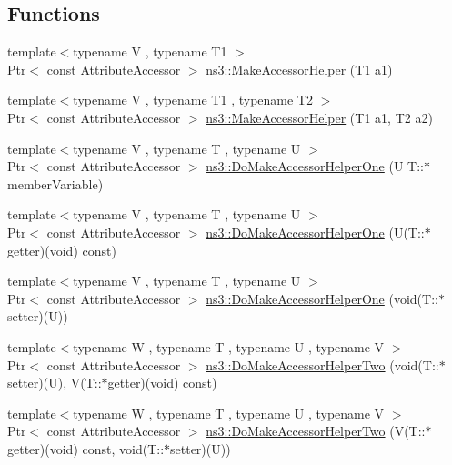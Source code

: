 \subsection*{Functions}
\begin{DoxyCompactItemize}
\item 
{\footnotesize template$<$typename V , typename T1 $>$ }\\Ptr$<$ const Attribute\+Accessor $>$ \hyperlink{group__attributeimpl_ga9fcb2910982e978ae6ee07b2909bfe2e}{ns3\+::\+Make\+Accessor\+Helper} (T1 a1)
\item 
{\footnotesize template$<$typename V , typename T1 , typename T2 $>$ }\\Ptr$<$ const Attribute\+Accessor $>$ \hyperlink{group__attributeimpl_ga17f73743ac49b64502707ca2b68dfa10}{ns3\+::\+Make\+Accessor\+Helper} (T1 a1, T2 a2)
\item 
{\footnotesize template$<$typename V , typename T , typename U $>$ }\\Ptr$<$ const Attribute\+Accessor $>$ \hyperlink{group__attributeimpl_gaee5b20c72f968868a1bef8f01db84263}{ns3\+::\+Do\+Make\+Accessor\+Helper\+One} (U T\+::$\ast$member\+Variable)
\item 
{\footnotesize template$<$typename V , typename T , typename U $>$ }\\Ptr$<$ const Attribute\+Accessor $>$ \hyperlink{group__attributeimpl_ga0e14362190176fd84511ad67a914108b}{ns3\+::\+Do\+Make\+Accessor\+Helper\+One} (U(T\+::$\ast$getter)(void) const)
\item 
{\footnotesize template$<$typename V , typename T , typename U $>$ }\\Ptr$<$ const Attribute\+Accessor $>$ \hyperlink{group__attributeimpl_gadc84053499d71ac5f8f243133a9b96b6}{ns3\+::\+Do\+Make\+Accessor\+Helper\+One} (void(T\+::$\ast$setter)(U))
\item 
{\footnotesize template$<$typename W , typename T , typename U , typename V $>$ }\\Ptr$<$ const Attribute\+Accessor $>$ \hyperlink{group__attributeimpl_ga690a8a90ca2e70070403aa3e44d20f99}{ns3\+::\+Do\+Make\+Accessor\+Helper\+Two} (void(T\+::$\ast$setter)(U), V(T\+::$\ast$getter)(void) const)
\item 
{\footnotesize template$<$typename W , typename T , typename U , typename V $>$ }\\Ptr$<$ const Attribute\+Accessor $>$ \hyperlink{group__attributeimpl_ga7f05cf56626baa91a1fbffb72a96a64c}{ns3\+::\+Do\+Make\+Accessor\+Helper\+Two} (V(T\+::$\ast$getter)(void) const, void(T\+::$\ast$setter)(U))

\end{DoxyCompactItemize}
